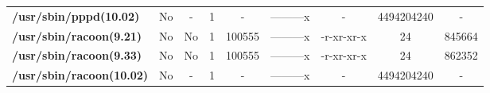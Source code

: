 \begin{center}
{\begin{tabular}{|>{\bfseries} l | C | C | C | C | C | C | C | C |}
					/usr/sbin/pppd(10.02) & No & - & 1 & - & ---------x & - & 4494204240 & -\\ 
					/usr/sbin/racoon(9.21) & No & No & \color{green}1 & \color{red}100555 & \color{green}---------x & \color{red}-r-xr-xr-x & \color{green}24 & \color{red}845664\\ 
					/usr/sbin/racoon(9.33) & No & No & \color{green}1 & \color{red}100555 & \color{green}---------x & \color{red}-r-xr-xr-x & \color{green}24 & \color{red}862352\\ 
					/usr/sbin/racoon(10.02) & No & - & 1 & - & ---------x & - & 4494204240 & -\\ 

			\end{tabular}
		}
	\end{center}


